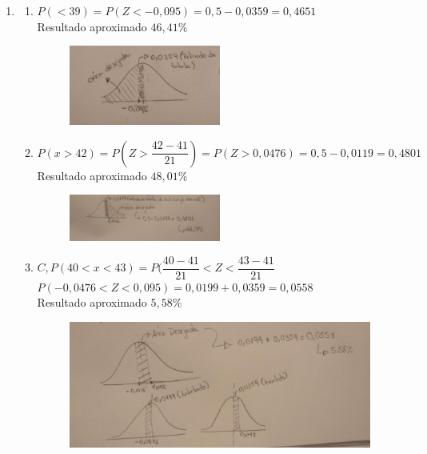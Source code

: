 \documentclass[a4paper, 12pt]{article}
\begin{document}
\begin{enumerate}
\begin{enumerate}
\end{enumerate}	
\item \begin{enumerate}
\item $P(< 39) = P(Z < - 0,095) = 0,5 - 0,0359 = 0,4651$ \\
Resultado aproximado $46,41 \%$ \\
\begin{figure}[!htb]
\centering
\includegraphics[width=0.5\textwidth]{fotos/figura-1.jpeg}
\end{figure}

\item $P(x > 42) = P(Z > \dfrac{42-41}{21}) = P(Z > 0,0476) = 0,5 - 0,0119 = 0,4801$
Resultado aproximado $48,01 \%$ \\
\begin{figure}[!htb]
\centering
\includegraphics[width=0.5\textwidth]{fotos/figura-2.jpeg}
\end{figure}

\item $C, P(40 < x < 43) = P(\dfrac{40 - 41}{21} < Z < \dfrac{43 - 41}{21}$ \\
$P(-0,0476 < Z < 0,095) = 0,0199 + 0,0359 = 0,0558$ \\
Resultado aproximado $5,58 \%$ \\
\begin{figure}[!htb]
\centering
\includegraphics[width=1\textwidth]{fotos/figura-3.jpeg}
\end{figure}


\end{enumerate}
\end{enumerate}
\end{document}
